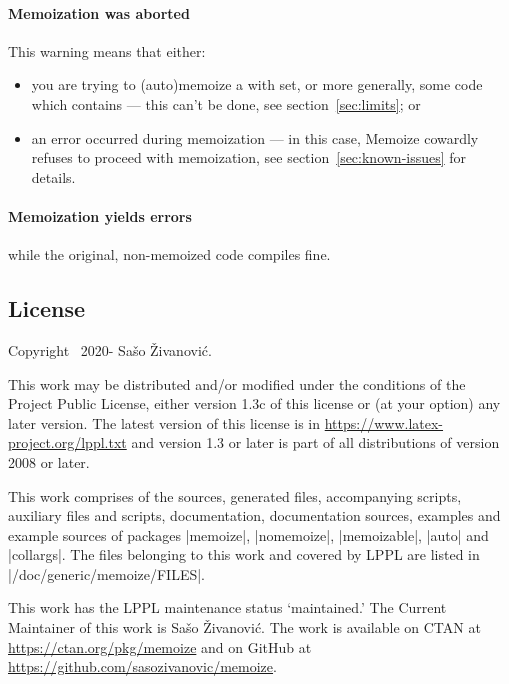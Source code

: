 \documentclass[a4paper,11pt]{article}
\begin{document}
\paragraph{Memoization was aborted}

This warning means that either:
\begin{itemize}
\item you are trying to (auto)memoize a  with
   set, or more generally, some code which
  contains  --- this can't be done, see
  section~\ref{sec:limits}; or
\item an error occurred during memoization --- in this case, Memoize cowardly
  refuses to proceed with memoization, see section~\ref{sec:known-issues} for
  details.
\end{itemize}

\paragraph*{Memoization yields errors} while the original, non-memoized code
compiles fine.


\subsection{License}

Copyright \textcopyright\ 2020- Sašo Živanović.

This work may be distributed and/or modified under the conditions of the
 Project Public License, either version 1.3c of this license or
(at your option) any later version.  The latest version of this license is
in \url{https://www.latex-project.org/lppl.txt} and version 1.3 or later is
part of all distributions of  version 2008 or later.

This work comprises of the sources, generated files, accompanying scripts,
auxiliary files and scripts, documentation, documentation sources, examples and
example sources of packages |memoize|, |nomemoize|, |memoizable|, |auto| and
|collargs|.  The files belonging to this work and covered by LPPL are listed in
|/doc/generic/memoize/FILES|.

This work has the LPPL maintenance status `maintained.' The Current Maintainer
of this work is Sašo Živanović.  The work is available on CTAN
at \url{https://ctan.org/pkg/memoize} and on GitHub
at \url{https://github.com/sasozivanovic/memoize}.
\end{document}
